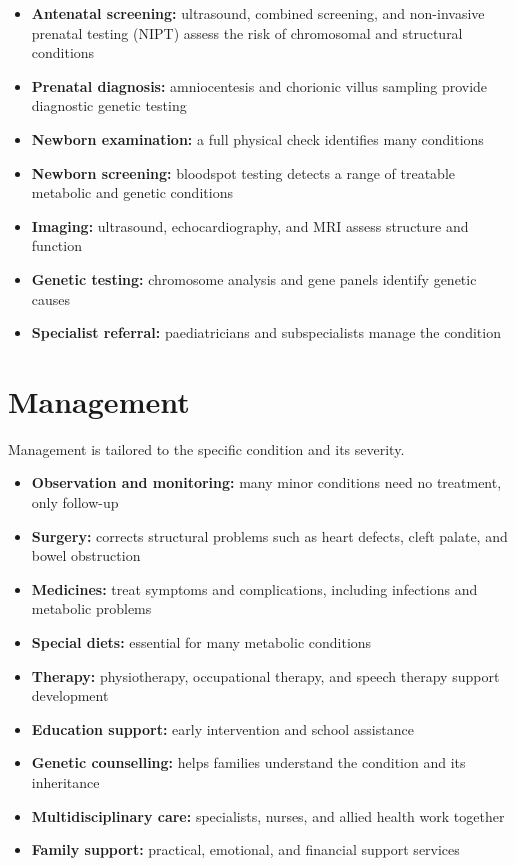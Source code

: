\begin{itemize}
    \item \textbf{Antenatal screening:} ultrasound, combined screening, and non-invasive prenatal testing (NIPT) assess the risk of chromosomal and structural conditions
    \item \textbf{Prenatal diagnosis:} amniocentesis and chorionic villus sampling provide diagnostic genetic testing
    \item \textbf{Newborn examination:} a full physical check identifies many conditions
    \item \textbf{Newborn screening:} bloodspot testing detects a range of treatable metabolic and genetic conditions
    \item \textbf{Imaging:} ultrasound, echocardiography, and MRI assess structure and function
    \item \textbf{Genetic testing:} chromosome analysis and gene panels identify genetic causes
    \item \textbf{Specialist referral:} paediatricians and subspecialists manage the condition
\end{itemize}

\section*{Management}
Management is tailored to the specific condition and its severity.

\begin{itemize}
    \item \textbf{Observation and monitoring:} many minor conditions need no treatment, only follow-up
    \item \textbf{Surgery:} corrects structural problems such as heart defects, cleft palate, and bowel obstruction
    \item \textbf{Medicines:} treat symptoms and complications, including infections and metabolic problems
    \item \textbf{Special diets:} essential for many metabolic conditions
    \item \textbf{Therapy:} physiotherapy, occupational therapy, and speech therapy support development
    \item \textbf{Education support:} early intervention and school assistance
    \item \textbf{Genetic counselling:} helps families understand the condition and its inheritance
    \item \textbf{Multidisciplinary care:} specialists, nurses, and allied health work together
    \item \textbf{Family support:} practical, emotional, and financial support services
\end{itemize}


